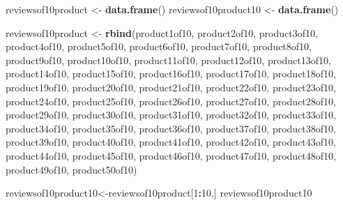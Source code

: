 \documentclass[
]{article}
\newenvironment{Shaded}{\begin{snugshade}}{\end{snugshade}}
\newcommand{\DecValTok}[1]{\textcolor[rgb]{0.00,0.00,0.81}{#1}}
\newcommand{\FunctionTok}[1]{\textcolor[rgb]{0.13,0.29,0.53}{\textbf{#1}}}
\newcommand{\NormalTok}[1]{#1}
\newcommand{\OtherTok}[1]{\textcolor[rgb]{0.56,0.35,0.01}{#1}}
\newcommand{\SpecialCharTok}[1]{\textcolor[rgb]{0.81,0.36,0.00}{\textbf{#1}}}
\begin{document}
\begin{Shaded}
\begin{Highlighting}[]
\NormalTok{  reviewsof10product }\OtherTok{\textless{}{-}} \FunctionTok{data.frame}\NormalTok{()}
\NormalTok{  reviewsof10product10 }\OtherTok{\textless{}{-}} \FunctionTok{data.frame}\NormalTok{()}
  
\NormalTok{  reviewsof10product }\OtherTok{\textless{}{-}} \FunctionTok{rbind}\NormalTok{(product1of10, product2of10, product3of10, product4of10, product5of10, product6of10, product7of10, product8of10, product9of10, product10of10, product11of10, product12of10, product13of10, product14of10, product15of10, product16of10, product17of10, product18of10, product19of10, product20of10, product21of10, product22of10, product23of10, product24of10, product25of10, product26of10, product27of10, product28of10, product29of10, product30of10, product31of10, product32of10, product33of10, product34of10, product35of10, product36of10, product37of10, product38of10, product39of10, product40of10, product41of10, product42of10, product43of10, product44of10, product45of10, product46of10, product47of10, product48of10, product49of10, product50of10)}

  
\NormalTok{  reviewsof10product10}\OtherTok{\textless{}{-}}\NormalTok{reviewsof10product[}\DecValTok{1}\SpecialCharTok{:}\DecValTok{10}\NormalTok{,]}
\NormalTok{  reviewsof10product10}
\end{Highlighting}
\end{Shaded}
\end{document}
